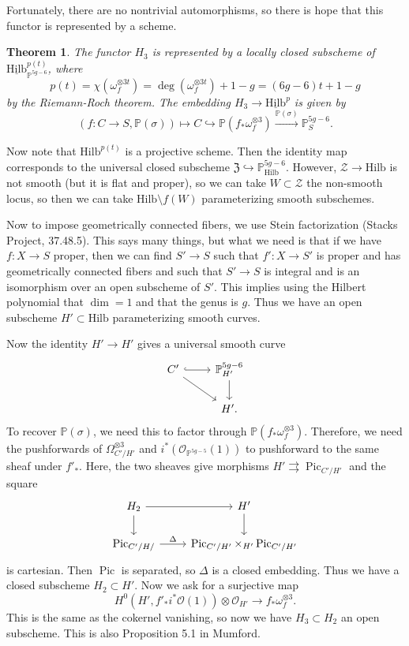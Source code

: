 \documentclass[leqno, openany]{memoir}
\newtheorem{thm}{Theorem}[section]
\theoremstyle{definition}
\theoremstyle{remark}
\theoremstyle{plain}
\theoremstyle{definition}
\theoremstyle{remark}
\renewcommand{\P}{\mathbb{P}}
\newcommand{\mc}[1]{\mathcal{#1}}
\newcommand{\mf}[1]{\mathfrak{#1}}
\newcommand{\mr}[1]{\mathrm{#1}}
\newcommand{\ul}[1]{\underline{#1}}
\DeclareMathOperator{\Pic}{Pic}
\begin{document}
Fortunately, there are no nontrivial automorphisms, so there is hope that this
functor is represented by a scheme.

\begin{thm} The functor $H_3$ is represented by a locally closed subscheme of
    $\ul{\mr{Hilb}}_{\P^{5g-6}}^{p(t)}$, where \[ p(t) = \chi(\omega_f^{\otimes
    3t}) = \deg(\omega_f^{\otimes 3t}) + 1 - g = (6g-6)t + 1-g\]  by the
    Riemann-Roch theorem. The embedding $H_3 \to \ul{\mr{Hilb}}^p$ is given by
    \[ (f \colon C \to S, \P(\sigma)) \mapsto C \hookrightarrow \P(f_*
    \omega_f^{\otimes 3}) \xrightarrow{\P(\sigma)} \P_S^{5g-6}. \] \end{thm}

Now note that $\mr{Hilb}^{p(t)}$ is a projective scheme. Then the identity map
corresponds to the universal closed subscheme $\mf{Z} \hookrightarrow
\P^{5g-6}_{\mr{Hilb}}$. However, $\mc{Z} \to \mr{Hilb}$ is not smooth (but it
is flat and proper), so we can take $W \subset \mc{Z}$ the non-smooth locus, so
then we can take $\mr{Hilb} \setminus f(W)$ parameterizing smooth subschemes.

Now to impose geometrically connected fibers, we use Stein factorization
(Stacks Project, 37.48.5). This says many things, but what we need is that if
we have $f \colon X \to S$ proper, then we can find $S' \to S$ such that
$f'\colon X \to S'$ is proper and has geometrically connected fibers and such
that $S' \to S$ is integral and is an isomorphism over an open subscheme of
$S'$. This implies using the Hilbert polynomial that $\dim = 1$ and that the
genus is $g$. Thus we have an open subscheme $H' \subset \mr{Hilb}$
parameterizing smooth curves.

Now the identity $H' \to H'$ gives a universal smooth curve \begin{equation*}
    \begin{tikzcd} C' \arrow[hookrightarrow]{r} \arrow{dr} & \P_{H'}^{5g-6}
    \arrow{d} \\ & H'.  \end{tikzcd} \end{equation*} To recover $\P(\sigma)$,
    we need this to factor through $\P(f_* \omega_f^{\otimes 3})$. Therefore,
    we need the pushforwards of $\Omega_{C'/H'}^{\otimes 3}$ and
    $i^*(\mc{O}_{\P^{5g-5}}(1))$ to pushforward to the same sheaf under $f'_*$.
    Here, the two sheaves give morphisms $H' \rightrightarrows \Pic_{C'/H'}$
    and the square \begin{equation*} \begin{tikzcd} H_2 \arrow{r} \arrow{d} &
    H' \arrow{d} \\ \Pic_{C'/H/} \arrow{r}{\Delta} & \Pic_{C'/H'} \times_{H'}
\Pic_{C'/H'} \end{tikzcd} \end{equation*} is cartesian. Then $\Pic$ is
separated, so $\Delta$ is a closed embedding. Thus we have a closed subscheme
$H_2 \subset H'$. Now we ask for a surjective map \[ H^0(H', f'_* i^*
\mc{O}(1)) \otimes \mc{O}_{H'} \to f_* \omega_f^{\otimes 3}. \] This is the
same as the cokernel vanishing, so now we have $H_3 \subset H_2$ an open
subscheme. This is also Proposition 5.1 in Mumford.
\end{document}
